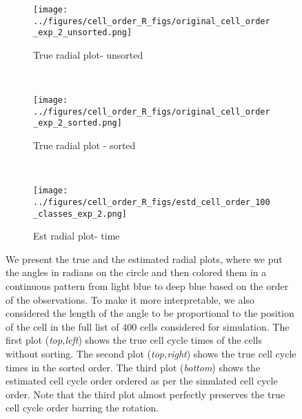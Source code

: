 \documentclass[11pt]{article}
\begin{document}
\begin{figure*}[ht]
    \centering
     \begin{subfigure}[t]{0.5\textwidth}
        \centering
        \texttt{[image: ../figures/cell\_order\_R\_figs/original\_cell\_order\_exp\_2\_unsorted.png]}
        \caption{True radial plot- unsorted}
    \end{subfigure}%
    ~
    \begin{subfigure}[t]{0.5\textwidth}
        \centering
        \texttt{[image: ../figures/cell\_order\_R\_figs/original\_cell\_order\_exp\_2\_sorted.png]}
        \caption{True radial plot - sorted}
    \end{subfigure}\\

     \begin{subfigure}[t]{0.5\textwidth}
        \centering
        \texttt{[image: ../figures/cell\_order\_R\_figs/estd\_cell\_order\_100\_classes\_exp\_2.png]}
        \caption{Est radial plot- time}
    \end{subfigure}
    \caption{We present the true and the estimated radial plots, where we put the angles in radians on the circle and then colored them in a continuous pattern from light blue  to deep blue based on the order of the observations. To make it more interpretable, we also considered the length of the angle to be proportional to the position of the cell in the full list of $400$ cells considered for simulation. The first plot (\textit{top,left}) shows the true cell cycle times of the cells without sorting. The second plot (\textit{top,right}) shows the true cell cycle times in the sorted order. The third plot (\textit{bottom}) shows the estimated cell cycle order ordered as per the simulated cell cycle order. Note that the third plot almost perfectly preserves the true cell cycle order barring the rotation.}
 \label{fig:fig3}
 \end{figure*}
\end{document}
